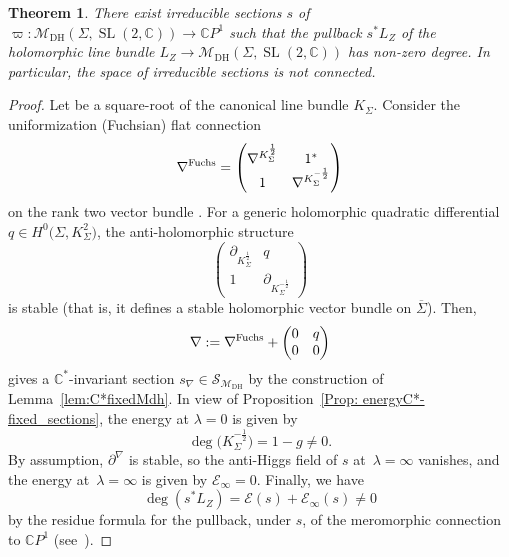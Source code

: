 \documentclass[pdftex]{sigma}
\numberwithin{equation}{section}
\newtheorem{Theorem}{Theorem}[section]
\theoremstyle{definition}
\newcommand\C{{\mathbb C}}
\begin{document}
\begin{Theorem}\label{Thm: Hyperholnontrivial}
There exist irreducible sections $s$ of $\varpi\colon \mathcal{M}_{\mathrm{DH}} (\Sigma,\operatorname{SL}(2,\C)) \longrightarrow \C P^1$ such that the pullback $s^* L_Z$ of the holomorphic line bundle
$L_Z \longrightarrow \mathcal{M}_{\mathrm{DH}}(\Sigma,\operatorname{SL}(2,\C))$ has non-zero degree. In particular, the space of irreducible sections is not connected.
\end{Theorem}

\begin{proof}
Let  be a square-root of the canonical line bundle $K_\Sigma$.
Consider the uniformization (Fuchsian) flat connection
\[\nabla^{\rm Fuchs}=\begin{pmatrix} \nabla^{K_\Sigma^{\frac{1}{2}}} & 1^*\\ 1 & \nabla^{K_\Sigma^{-\frac{1}{2}}} \end{pmatrix}\]
on the rank two vector bundle .
For a generic holomorphic quadratic differential~${q \in H^0\bigl(\Sigma, K_\Sigma^2\bigr)}$, the anti-holomorphic structure
\[\begin{pmatrix} \partial_{K_\Sigma^{\frac{1}{2}}} & q\\ 1 & \partial_{K_\Sigma^{-\frac{1}{2}}} \end{pmatrix}\]
is stable (that is, it defines a stable holomorphic vector bundle on $\overline\Sigma$).
Then,
\[\nabla := \nabla^{\rm Fuchs}+\begin{pmatrix}0&q\\0&0\end{pmatrix}\]
gives a $\C^*$-invariant section $s_\nabla \in \mathcal S_{\mathcal{M}_{\mathrm{DH}}}$ by the construction of Lemma~\ref{lem:C*fixedMdh}.
In view of Proposition~\ref{Prop: energyC*-fixed_sections},
the energy at $\lambda = 0$ is given by
\[\deg{\bigl(K_\Sigma^{-\frac{1}{2}}\bigr)} = 1-g \neq 0 .\]
By assumption, $\partial^\nabla$ is stable, so the anti-Higgs field of $s$ at~${\lambda = \infty}$
vanishes, and the energy at~${\lambda=\infty}$ is given by $\mathcal E_\infty = 0.$
Finally, we have
\[\deg(s^*L_Z) = \mathcal E(s)+\mathcal E_\infty(s) \neq 0\]
by the residue formula for the pullback, under $s$, of the meromorphic connection to $\C P^1$ (see~\cite[Section~3]{BeHeRo}).
\end{proof}
\end{document}
